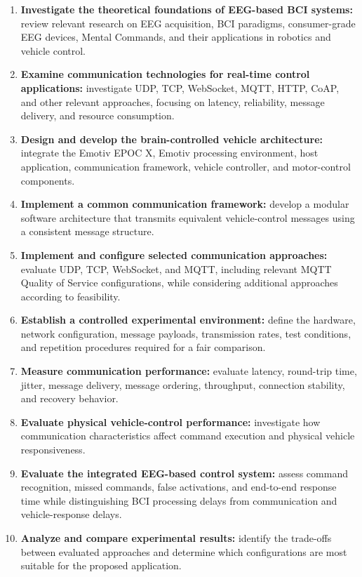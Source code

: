 \begin{enumerate}
  \item \textbf{Investigate the theoretical foundations of EEG-based BCI systems:} review relevant research on EEG acquisition, BCI paradigms, consumer-grade EEG devices, Mental Commands, and their applications in robotics and vehicle control.
  \item \textbf{Examine communication technologies for real-time control applications:} investigate UDP, TCP, WebSocket, MQTT, HTTP, CoAP, and other relevant approaches, focusing on latency, reliability, message delivery, and resource consumption.
  \item \textbf{Design and develop the brain-controlled vehicle architecture:} integrate the Emotiv EPOC X, Emotiv processing environment, host application, communication framework, vehicle controller, and motor-control components.
  \item \textbf{Implement a common communication framework:} develop a modular software architecture that transmits equivalent vehicle-control messages using a consistent message structure.
  \item \textbf{Implement and configure selected communication approaches:} evaluate UDP, TCP, WebSocket, and MQTT, including relevant MQTT Quality of Service configurations, while considering additional approaches according to feasibility.
  \item \textbf{Establish a controlled experimental environment:} define the hardware, network configuration, message payloads, transmission rates, test conditions, and repetition procedures required for a fair comparison.
  \item \textbf{Measure communication performance:} evaluate latency, round-trip time, jitter, message delivery, message ordering, throughput, connection stability, and recovery behavior.
  \item \textbf{Evaluate physical vehicle-control performance:} investigate how communication characteristics affect command execution and physical vehicle responsiveness.
  \item \textbf{Evaluate the integrated EEG-based control system:} assess command recognition, missed commands, false activations, and end-to-end response time while distinguishing BCI processing delays from communication and vehicle-response delays.
  \item \textbf{Analyze and compare experimental results:} identify the trade-offs between evaluated approaches and determine which configurations are most suitable for the proposed application.
\end{enumerate}

